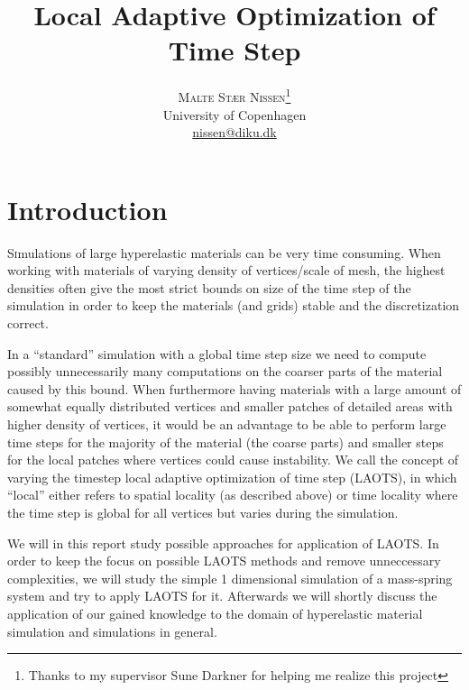\documentclass[11pt]{article}
\title{\vspace{-15mm}\fontsize{24pt}{10pt}\selectfont\textbf{Local Adaptive
Optimization of Time Step}} %
\author{
\large
\textsc{Malte Stær Nissen}\thanks{Thanks to my supervisor Sune Darkner for
helping me realize this project}\\[2mm] %
\normalsize University of Copenhagen \\ %
\normalsize \href{mailto:nissen@diku.dk}{nissen@diku.dk} %
\vspace{-5mm}
}
\date{}
\begin{document}
\maketitle %

\thispagestyle{fancy} %







\section{Introduction}
\lettrine[nindent=0em,lines=3]{S} imulations of large hyperelastic materials
can be very time consuming. When working with materials of varying density
of vertices/scale of mesh, the highest densities often give the most
strict bounds on size of the time step of the simulation in order to keep
the materials (and grids) stable and the discretization correct.

In a ``standard'' simulation with a global time step size we need to compute
possibly unnecessarily many computations on the coarser parts of the material
caused by this bound. When furthermore having materials with a large amount
of somewhat equally distributed vertices and smaller patches of detailed
areas with higher density of vertices, it would be an advantage to be able
to perform large time steps for the majority of the material (the coarse
parts) and smaller steps for the local patches where vertices could cause
instability. We call the concept of varying the timestep local adaptive
optimization of time step (LAOTS), in which ``local'' either refers to spatial
locality (as described above) or time locality where the time step is global
for all vertices but varies during the simulation.

We will in this report
study possible approaches for application of LAOTS. In order to keep the focus
on possible LAOTS methods and remove unneccessary complexities, we will study
the simple 1 dimensional simulation of a mass-spring system and try to apply
LAOTS for it. Afterwards we will shortly discuss the application of our gained
knowledge to the domain of hyperelastic material simulation and simulations in
general.
\end{document}
